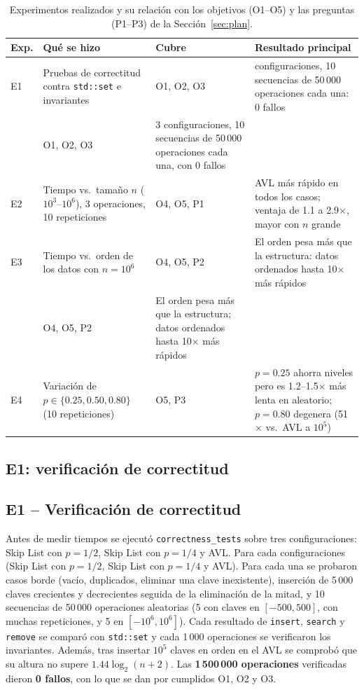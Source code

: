 \documentclass[11pt,a4paper]{article}
\begin{document}
\begin{table}[!htb]
\centering
\renewcommand{\arraystretch}{1.2}
\small
\begin{tabularx}{\textwidth}{l >{\raggedright\arraybackslash}p{3.6cm} l >{\raggedright\arraybackslash}X}
\toprule
\textbf{Exp.} & \textbf{Qué se hizo} & \textbf{Cubre} & \textbf{Resultado principal} \\
\midrule
E1 & Pruebas de correctitud contra \texttt{std::set} e invariantes
   & O1, O2, O3 & 3 configuraciones, 10 secuencias de 50\,000 operaciones cada una: 0 fallos \\
   & O1, O2, O3 & 3 configuraciones, 10 secuencias de 50\,000 operaciones cada una, con 0 fallos \\
E2 & Tiempo vs.\ tamaño $n$ ($10^3$--$10^6$), 3 operaciones, 10 repeticiones
   & O4, O5, P1 & AVL más rápido en todos los casos; ventaja de 1.1 a 2.9$\times$, mayor con $n$ grande \\
E3 & Tiempo vs.\ orden de los datos con $n=10^6$
   & O4, O5, P2 & El orden pesa más que la estructura: datos ordenados hasta 10$\times$ más rápidos \\
   & O4, O5, P2 & El orden pesa más que la estructura; datos ordenados hasta 10$\times$ más rápidos \\
E4 & Variación de $p \in \{0.25, 0.50, 0.80\}$ (10 repeticiones)
   & O5, P3 & $p=0.25$ ahorra niveles pero es 1.2--1.5$\times$ más lenta en aleatorio; $p=0.80$ degenera (51$\times$ vs.\ AVL a $10^5$) \\
\bottomrule
\end{tabularx}
\caption{Experimentos realizados y su relación con los objetivos (O1--O5) y
las preguntas (P1--P3) de la Sección~\ref{sec:plan}.}
\label{tab:experimentos}
\end{table}

\subsection{E1: verificación de correctitud}
\subsection{E1 -- Verificación de correctitud}

Antes de medir tiempos se ejecutó \texttt{correctness\_tests} sobre tres
configuraciones: Skip List con $p=1/2$, Skip List con $p=1/4$ y AVL. Para cada
configuraciones (Skip List con $p=1/2$, Skip List con $p=1/4$ y AVL). Para cada
una se probaron casos borde (vacío, duplicados, eliminar una clave
inexistente), inserción de 5\,000 claves crecientes y decrecientes seguida de
la eliminación de la mitad, y 10 secuencias de 50\,000 operaciones aleatorias
(5 con claves en $[-500, 500]$, con muchas repeticiones, y 5 en
$[-10^6, 10^6]$). Cada resultado de \texttt{insert}, \texttt{search} y
\texttt{remove} se comparó con \texttt{std::set} y cada 1\,000 operaciones se
verificaron los invariantes. Además, tras insertar $10^5$ claves en orden en el
AVL se comprobó que su altura no supere $1.44\log_2(n+2)$. Las
\textbf{1\,500\,000 operaciones} verificadas dieron \textbf{0 fallos}, con lo
que se dan por cumplidos O1, O2 y O3.
\end{document}
